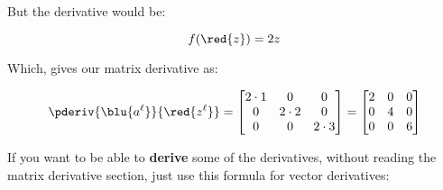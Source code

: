         But the derivative would be:
        
        \begin{equation}
            f(\red{z}) = 2z
        \end{equation}
        
        Which, gives our matrix derivative as:
        
        \begin{equation*}
            \pderiv {\blu{a^\ell}}   {\red{z^\ell}}
            =
            \begin{bmatrix}
                2\cdot 1 & 0         & 0         \\
                0        & 2 \cdot 2 & 0         \\
                0        & 0         & 2 \cdot 3 \\
            \end{bmatrix}
            =
            \begin{bmatrix}
                2 & 0 & 0  \\
                0 & 4 & 0  \\
                0 & 0 & 6  \\
            \end{bmatrix}
        \end{equation*}
        
        If you want to be able to \textbf{derive} some of the derivatives, without reading the matrix derivative section, just use this formula for vector derivatives:
        
